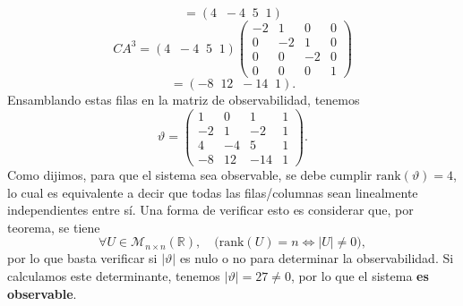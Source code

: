 \documentclass[
  11pt,
  letterpaper,
   addpoints,
   answers
  ]{exam}
\begin{document}
\begin{questions}
\begin{solution}
\begin{equation}
=(4\;\;-4\;\;5\;\;1)
\end{equation}
\begin{equation}
CA^{3}=(4\;\;-4\;\;5\;\;1)
\begin{pmatrix}
-2&1&0&0\\
0&-2&1&0\\
0&0&-2&0\\
0&0&0&1
\end{pmatrix}
\end{equation}
\begin{equation}
=(-8\;\;12\;\;-14\;\;1).
\end{equation}
Ensamblando estas filas en la matriz de observabilidad, tenemos
\begin{equation}
\vartheta=
\begin{pmatrix}
1&0&1&1\\
-2&1&-2&1\\
4&-4&5&1\\
-8&12&-14&1
\end{pmatrix}.
\end{equation}
Como dijimos, para que el sistema sea observable, se debe cumplir $\mathrm{rank}(\vartheta)=4$, lo cual es equivalente a decir que todas las filas/columnas sean linealmente independientes entre sí. Una forma de verificar esto es considerar que, por teorema, se tiene
\begin{equation}
\forall U\in \mathcal{M}_{n\times n}(\mathbb{R}),\quad
\big(\mathrm{rank}(U)=n \Leftrightarrow |U|\neq 0\big),
\end{equation}
por lo que basta verificar si $|\vartheta|$ es nulo o no para determinar la observabilidad. Si calculamos este determinante, tenemos $|\vartheta|=27\neq 0$, por lo que el sistema \textbf{es observable}.


\end{solution}
\end{questions}
\end{document}
